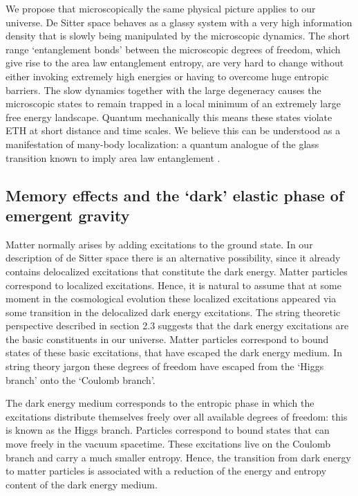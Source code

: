 \documentclass[a4paper,12pt]{article}
\begin{document}
We propose that microscopically the same physical picture applies to our universe. De Sitter space behaves as a glassy system with a very high information density that is 
slowly being manipulated by the microscopic dynamics.  
The short range `entanglement bonds' between the microscopic degrees of freedom, which give rise to the area law entanglement entropy,  are very hard to change 
without either invoking extremely high energies or
having to overcome huge entropic barriers. %
The slow dynamics together with the large degeneracy causes the 
microscopic states to remain trapped in a local minimum of an extremely large free energy landscape. %
Quantum mechanically this means these states violate ETH at short distance and time scales. We believe this can be understood as a manifestation of many-body localization: a quantum analogue of the glass transition known to imply area law entanglement \cite{Huse1, Grover}.  

\subsection{Memory effects and the `dark' elastic phase of emergent gravity}

Matter normally arises by adding excitations to the ground state. In our description of de Sitter space there is an alternative possibility, since it already contains delocalized excitations that constitute the dark energy. Matter particles correspond to localized excitations. Hence, it is natural to assume that at some moment in the cosmological evolution these localized excitations  appeared via some transition in the delocalized dark energy excitations. The string theoretic perspective described in section 2.3 suggests that the dark energy excitations are the basic constituents in our universe. Matter particles correspond to bound states of these basic excitations, that have escaped the dark energy medium.  In string theory jargon these degrees of freedom have escaped from the `Higgs branch' onto the `Coulomb branch'.  

The dark energy medium corresponds to the entropic phase in which the excitations distribute themselves freely over all available degrees of freedom: this is known as the Higgs branch.  Particles correspond to bound states that can move freely in the vacuum spacetime. These excitations live on the Coulomb branch and carry a much smaller entropy.  Hence, the transition from dark energy to matter particles is associated with a reduction of the energy and entropy content of the dark energy medium. 
\end{document}
